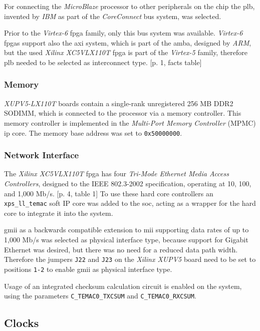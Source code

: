 For connecting the \textit{MicroBlaze} processor to other peripherals on the chip the \gls{plb}, invented by \textit{IBM} as part of the \textit{CoreConnect} bus system, was selected.

Prior to the \textit{Virtex-6} \gls{fpga} family, only this bus system was available. \textit{Virtex-6} \gls{fpga}s support also the \gls{axi} system, which is part of the \gls{amba}, designed by \textit{ARM}, but the used \textit{Xilinx XC5VLX110T} \gls{fpga} is part of the \textit{Virtex-5} family, therefore \gls{plb} needed to be selected as interconnect type. \cite{axi_interconnect}[p. 1, facts table]

\subsubsection{Memory}

\textit{XUPV5-LX110T} boards contain a single-rank unregistered 256 MB DDR2 SODIMM, which is connected to the processor via a memory controller. This memory controller is implemented in the \textit{Multi-Port Memory Controller} (MPMC) \gls{ip} core. The memory base address was set to \texttt{0x50000000}.

\subsubsection{Network Interface}

The \textit{Xilinx XC5VLX110T} \gls{fpga} has four \textit{Tri-Mode Ethernet Media Access Controllers}, designed to the IEEE 802.3-2002 specification, operating at 10, 100, and 1,000 Mb/s. \cite{virtex5}[p. 4, table 1] To use these hard core controllers an \texttt{xps\_ll\_temac} soft IP core was added to the \gls{soc}, acting as a wrapper for the hard core to integrate it into the system.


\gls{gmii} as a backwards compatible extension to \gls{mii} supporting data rates of up to 1,000 Mb/s was selected as physical interface type, because support for Gigabit Ethernet was desired, but there was no need for a reduced data path width. Therefore the jumpers \texttt{J22} and \texttt{J23} on the \textit{Xilinx XUPV5} board need to be set to positions \texttt{1-2} to enable \gls{gmii} as physical interface type.

Usage of an integrated checksum calculation circuit is enabled on the system, using the parameters \texttt{C\_TEMAC0\_TXCSUM} and \texttt{C\_TEMAC0\_RXCSUM}.

\subsection{Clocks}
\label{sec:clocks}

